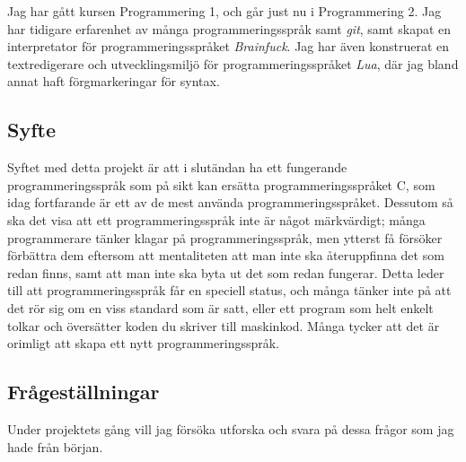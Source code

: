\documentclass{theme}
\begin{document}
Jag har gått kursen Programmering 1, och går just nu i Programmering 2. Jag har
tidigare erfarenhet av många programmeringsspråk samt \textit{git}, samt skapat 
en interpretator för programmeringsspråket \textit{Brainfuck}. Jag har även 
konstruerat en textredigerare och utvecklingsmiljö för programmeringsspråket
\textit{Lua}, där jag bland annat haft förgmarkeringar för syntax. 

\subsection{Syfte}

Syftet med detta projekt är att i slutändan ha ett fungerande 
programmeringsspråk som på sikt kan ersätta programmeringsspråket C, som idag 
fortfarande är ett av de mest använda programmeringsspråket. Dessutom så ska det
visa att ett programmeringsspråk inte är något märkvärdigt; många programmerare
tänker klagar på programmeringsspråk, men ytterst få försöker förbättra dem 
eftersom att mentaliteten att man inte ska återuppfinna det som redan finns, 
samt att man inte ska byta ut det som redan fungerar. Detta leder till att 
programmeringsspråk får en speciell status, och många tänker inte på att det 
rör sig om en viss standard som är satt, eller ett program som helt enkelt 
tolkar och översätter koden du skriver till maskinkod. Många tycker att det är 
orimligt att skapa ett nytt programmeringsspråk.

\subsection{Frågeställningar}

Under projektets gång vill jag försöka utforska och svara på dessa frågor som
jag hade från början. 
\end{document}
